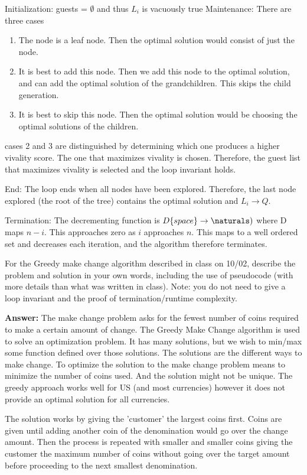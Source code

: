 \documentclass{article}
\begin{document}
 Initialization: guests = $\emptyset$ and thus $L_i$ is vacuously true
 Maintenance: There are three cases
 \begin{enumerate}[1.]
 \item The node is a leaf node. Then the optimal solution would consist of just the node.
 \item It is best to add this node. Then we add this node to the optimal solution, and can add the optimal solution of the grandchildren. This skips the child generation.
 \item It is best to skip this node. Then the optimal solution would be choosing the optimal solutions of the children.
 \end{enumerate}
 cases 2 and 3 are distinguished by determining which one produces a higher vivality score. The one that maximizes vivality is chosen. Therefore, the guest list that maximizes vivality is selected and the loop invariant holds.
 
 End: The loop ends when all nodes have been explored. Therefore, the last node explored (the root of the tree) contains the optimal solution and $L_i \rightarrow Q$.
 
 Termination: The decrementing function is $D\{space\} \rightarrow \naturals)$ where D maps $n - i$. This approaches zero as $i$ approaches $n$. This maps to a well ordered set and decreases each iteration, and the algorithm therefore terminates.


\nextprob
For the Greedy make change algorithm described in class on 10/02, describe the
problem and solution in your own words, including the use of pseudocode (with
more details than what was written in class).  Note: you do not need to give a
loop invariant and the proof of termination/runtime complexity.

\textbf{Answer:} The make change problem asks for the fewest number of coins required to make a certain amount of change. The Greedy Make Change algorithm is used to solve an optimization problem. It has many solutions, but we wish to min/max some function defined over those solutions. The solutions are the different ways to make change. To optimize the solution to the make change problem means to minimize the number of coins used. And the solution might not be unique. The greedy approach works well for US (and most currencies) however it does not provide an optimal solution for all currencies. 

The solution works by giving the 'customer' the largest coins first. Coins are given until adding another coin of the denomination would go over the change amount. Then the process is repeated with smaller and smaller coins giving the customer the maximum number of coins without going over the target amount before proceeding to the next smallest denomination.
\end{document}
